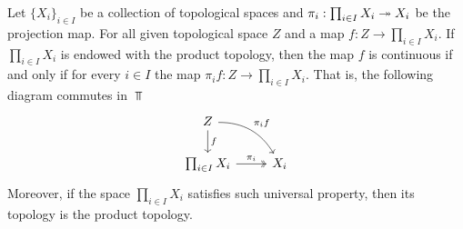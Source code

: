 \begin{theorem}
    \label{thm: prod top universal prop}
    Let \(\{X_i\}_{i \in I}\) be a collection of topological spaces and \(\pi_i:
    \prod_{i \in I} X_i \twoheadrightarrow  X_i\) be the projection map. For all given
    topological space \(Z\) and a map \(f: Z \to \prod_{i \in I} X_i\). If
    \(\prod_{i \in I} X_i\) is endowed with the product topology, then the map
    \(f\) is continuous if and only if for every \(i \in I\) the map \(\pi_i
    f: Z \to \prod_{i \in I} X_i\). That is, the following diagram commutes in
    \(\Top\)
    \[
        \begin{tikzcd}
            Z \ar[d, "f"] \ar[dr, bend left, "\pi_i  f"] \\
            \prod_{i \in I} X_i \ar[r, two heads, "\pi_i"] &X_i
        \end{tikzcd}
    \]
    Moreover, if the space \(\prod_{i \in I} X_i\) satisfies such universal
    property, then its topology is the product topology.
\end{theorem}

